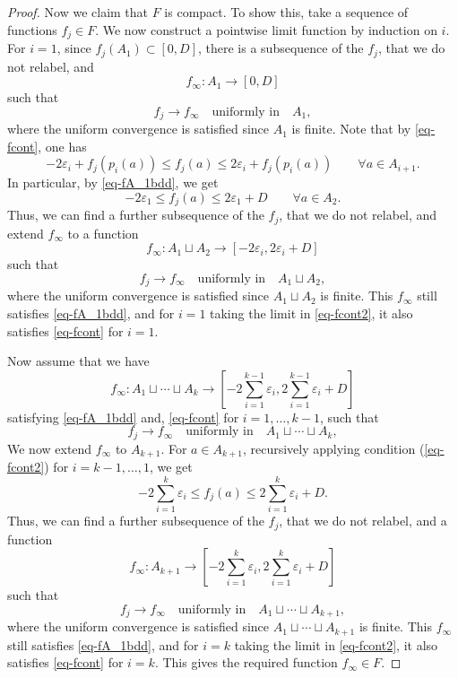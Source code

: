 \documentclass[a4paper,12pt,reqno]{amsart}
\theoremstyle{plain}
\newcommand{\be}{\begin{equation}}
\newcommand{\ee}{\end{equation}}
\newcommand{\disjointunion}{\sqcup}
\begin{document}
\begin{proof}
Now we claim that $F$ is compact. To show this, take a sequence of functions $f_j \in F$. We now construct a pointwise limit function by induction on $i$.
For $i=1$, 
since $f_j(A_1) \subset [0,D]$, there is a subsequence of the $f_j$, that we do not relabel, 
and 
\be
f_\infty: A_1 \to [0,D]
\ee
such that 
\be
f_j \to f_\infty  \quad \text{uniformly in} \quad A_1,
\ee
where the uniform convergence is satisfied since $A_1$ is finite. 
Note that by \eqref{eq-fcont}, one has 
\begin{equation}\label{eq-fcont2}
    -2\varepsilon_i + f_j(p_i(a)) \leq f_j(a) \leq 2\varepsilon_i + f_j(p_i(a)) \qquad \forall a \in A_{i+1}. 
\end{equation}
In particular, by \eqref{eq-fA_1bdd}, we get 
 \be
-2\varepsilon_1 \leq f_j(a) \leq 2\varepsilon_1 + D \qquad \forall a \in A_2. 
\ee
Thus, we can find a further subsequence of the $f_j$, that we do not relabel, and extend $f_\infty$ to a function 
\be
f_\infty: A_1 \disjointunion A_2 \to [-2\varepsilon_i,2\varepsilon_i+D]
\ee
 such that 
\be
f_j \to f_\infty  \quad \text{uniformly in} \quad  A_1\disjointunion A_2,
\ee
where the uniform convergence is satisfied since $A_1 \disjointunion A_2$ is finite. This 
$f_\infty$ still satisfies \eqref{eq-fA_1bdd}, and for $i=1$ taking the limit in \eqref{eq-fcont2}, it also satisfies \eqref{eq-fcont} for $i=1$. 

Now assume that we have 
\be
f_\infty : A_1 \disjointunion \cdots \disjointunion A_k \to [ -2\sum_{i=1}^{k-1}\varepsilon_i, 2\sum_{i=1}^{k-1}\varepsilon_i +D ]
\ee
satisfying \eqref{eq-fA_1bdd} and, \eqref{eq-fcont} for $i=1,\ldots,k-1$, such that
\be
f_j \to f_\infty  \quad \text{uniformly in} \quad  A_1 \disjointunion \cdots \disjointunion A_k,
\ee
We now extend $f_\infty$ to $A_{k+1}$.
For $a \in A_{k+1}$, recursively applying condition (\ref{eq-fcont2}) for $i=k-1,\ldots,1$, we get 
\be
-2\sum_{i=1}^{k}\varepsilon_i  \leq f_j(a) \leq  2\sum_{i=1}^{k}\varepsilon_i+ D. 
\ee
Thus, we can find a further subsequence of the $f_j$, that we do not relabel, and a function 
\be
f_\infty: A_{k+1} \to [-2\sum_{i=1}^{k}\varepsilon_i , 2\sum_{i=1}^{k}\varepsilon_i+D]
\ee
 such that 
\be
f_j \to f_\infty  \quad \text{uniformly in} \quad  A_1 \disjointunion \cdots \disjointunion A_{k+1},
\ee
where the uniform convergence is satisfied since $
A_1 \disjointunion \cdots \disjointunion A_{k+1}
$ is finite. This 
$f_\infty$ still satisfies \eqref{eq-fA_1bdd}, and for $i=k$ taking the limit in \eqref{eq-fcont2}, it also satisfies \eqref{eq-fcont} for $i=k$. 
This gives the required function $f_\infty \in F$.


\end{proof}
\end{document}
